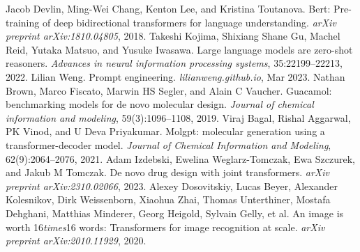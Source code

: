 \begin{chapterreferences}
 Jacob Devlin, Ming-Wei Chang, Kenton Lee, and Kristina Toutanova. Bert: Pre-training of deep bidirectional transformers for language understanding. \emph{arXiv preprint arXiv:1810.04805}, 2018.
 Takeshi Kojima, Shixiang Shane Gu, Machel Reid, Yutaka Matsuo, and Yusuke Iwasawa. Large language models are zero-shot reasoners. \emph{Advances in neural information processing systems}, 35:22199--22213, 2022.
 Lilian Weng. Prompt engineering. \emph{lilianweng.github.io}, Mar 2023.
 Nathan Brown, Marco Fiscato, Marwin HS Segler, and Alain C Vaucher. Guacamol: benchmarking models for de novo molecular design. \emph{Journal of chemical information and modeling}, 59(3):1096--1108, 2019.
 Viraj Bagal, Rishal Aggarwal, PK Vinod, and U Deva Priyakumar. Molgpt: molecular generation using a transformer-decoder model. \emph{Journal of Chemical Information and Modeling}, 62(9):2064--2076, 2021.
 Adam Izdebski, Ewelina Weglarz-Tomczak, Ewa Szczurek, and Jakub M Tomczak. De novo drug design with joint transformers. \emph{arXiv preprint arXiv:2310.02066}, 2023.
 Alexey Dosovitskiy, Lucas Beyer, Alexander Kolesnikov, Dirk Weissenborn, Xiaohua Zhai, Thomas Unterthiner, Mostafa Dehghani, Matthias Minderer, Georg Heigold, Sylvain Gelly, et al. An image is worth 16\emph{times}16 words: Transformers for image recognition at scale. \emph{arXiv preprint arXiv:2010.11929}, 2020.
\end{chapterreferences}
